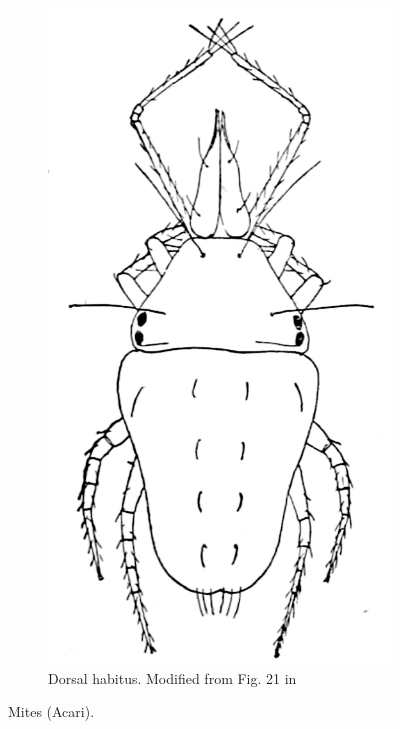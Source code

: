 \documentclass[letterpaper, 11pt]{article}
\begin{document}
\begin{figure}[ht!]
\begin{subfigure}[ht!]{0.2\textwidth}
        \includegraphics[width=\textwidth]{mite21.png}
        \caption{Dorsal habitus. Modified from Fig. 21 in \cite{bhlitem132773acari}}
        \label{fig:mite2}
    \end{subfigure}
    \caption{Mites (Acari).} \label{fig:mites}
\end{figure}
\end{document}
